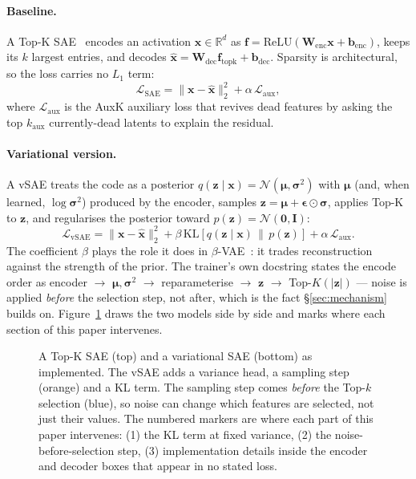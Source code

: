\documentclass[11pt]{article}
\begin{document}
\paragraph{Baseline.} A Top-K SAE~\citep{gao2024scalingevaluatingsparseautoencoders}
encodes an activation $\mathbf{x}\in\mathbb{R}^d$ as
$\mathbf{f}=\mathrm{ReLU}(\mathbf{W}_{\mathrm{enc}}\mathbf{x}+\mathbf{b}_{\mathrm{enc}})$,
keeps its $k$ largest entries, and decodes
$\hat{\mathbf{x}}=\mathbf{W}_{\mathrm{dec}}\mathbf{f}_{\mathrm{topk}}+\mathbf{b}_{\mathrm{dec}}$.
Sparsity is architectural, so the loss carries no $L_1$ term:
\begin{equation}
\mathcal{L}_{\mathrm{SAE}} = \|\mathbf{x}-\hat{\mathbf{x}}\|_2^2
+ \alpha\,\mathcal{L}_{\mathrm{aux}},
\label{eq:sae}
\end{equation}
where $\mathcal{L}_{\mathrm{aux}}$ is the AuxK auxiliary loss that revives dead
features by asking the top $k_{\mathrm{aux}}$ currently-dead latents to
explain the residual.

\paragraph{Variational version.} A vSAE treats the code as a posterior
$q(\mathbf{z}\mid\mathbf{x})=\mathcal{N}(\boldsymbol{\mu},\boldsymbol{\sigma}^2)$
with $\boldsymbol{\mu}$ (and, when learned, $\log\boldsymbol{\sigma}^2$)
produced by the encoder, samples $\mathbf{z}=\boldsymbol{\mu}+\boldsymbol{\epsilon}\odot\boldsymbol{\sigma}$,
applies Top-K to $\mathbf{z}$, and regularises the posterior toward
$p(\mathbf{z})=\mathcal{N}(\mathbf{0},\mathbf{I})$:
\begin{equation}
\mathcal{L}_{\mathrm{vSAE}} = \|\mathbf{x}-\hat{\mathbf{x}}\|_2^2
+ \beta\,\mathrm{KL}\!\left[q(\mathbf{z}\mid\mathbf{x})\,\|\,p(\mathbf{z})\right]
+ \alpha\,\mathcal{L}_{\mathrm{aux}}.
\label{eq:vsae}
\end{equation}
The coefficient $\beta$ plays the role it does in
$\beta$-VAE~\citep{higgins2017betavae}: it trades reconstruction against the
strength of the prior. The trainer's own docstring states the encode order as
encoder $\to$ $\boldsymbol{\mu},\boldsymbol{\sigma}^2$ $\to$
reparameterise $\to$ $\mathbf{z}$ $\to$ Top-$K(|\mathbf{z}|)$ --- noise is
applied \emph{before} the selection step, not after, which is the fact
\S\ref{sec:mechanism} builds on. Figure~\ref{fig:pipeline} draws the two
models side by side and marks where each section of this paper intervenes.

\begin{figure}[t]
\centering

\caption{A Top-K SAE (top) and a variational SAE (bottom) as implemented. The
vSAE adds a variance head, a sampling step (orange) and a KL term. The sampling
step comes \emph{before} the Top-$k$ selection (blue), so noise can change which
features are selected, not just their values. The numbered markers are where
each part of this paper intervenes: (1) the KL term at fixed variance,
(2) the noise-before-selection step, (3) implementation details inside the
encoder and decoder boxes that appear in no stated loss.}
\label{fig:pipeline}
\end{figure}
\end{document}
